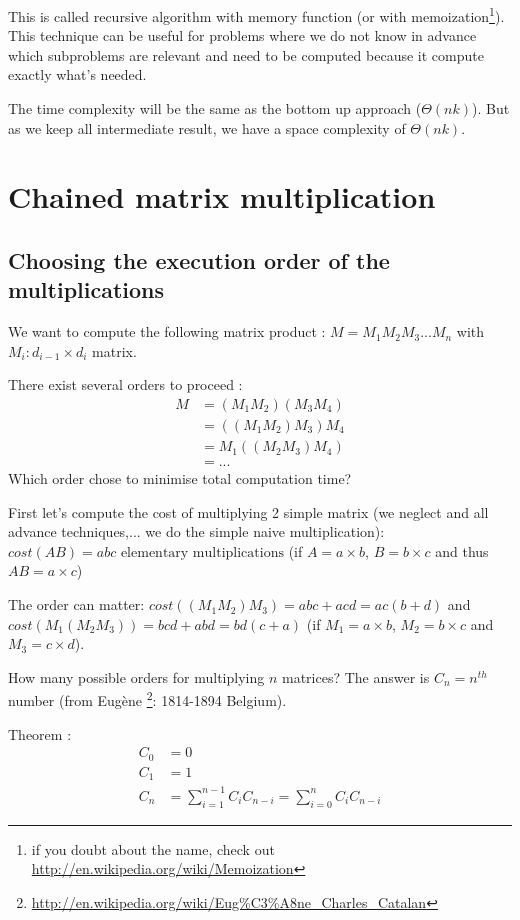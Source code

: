 This is called recursive algorithm with memory function (or with memoization\footnote{if you doubt about the name, check out \url{http://en.wikipedia.org/wiki/Memoization}}). This technique can be useful for problems where we do not know in advance which subproblems are relevant and need to be computed because it compute exactly what's needed.

The time complexity will be the same as the bottom up approach ($\Theta (nk)$). But as we keep all intermediate result, we have a space complexity of $\Theta (nk)$. 

\section{Chained matrix multiplication}

\subsection{Choosing the execution order of the multiplications}

We want to compute the following matrix product : $ M = M_1M_2M_3...M_n$ with $M_i:d_{i-1}\times d_{i}$ matrix.

There exist several orders to proceed :
\begin{align*}
M&=(M_1M_2)(M_3M_4)\\
 &= ((M_1M_2)M_3)M_4\\ 
 &= M_1((M_2M_3)M_4)\\
 &=...
\end{align*}
Which order chose to minimise total computation time?

First let's compute the cost of multiplying 2 simple matrix (we neglect  and all advance techniques,... we do the simple naive multiplication):\\
$cost(AB) = abc\text{ elementary multiplications}$ (if $A=a\times b$, $B=b\times c$ and thus $AB = a\times c$)

The order can matter: $cost((M_1M_2)M_3) = abc+acd = ac(b+d)$ and $cost(M_1(M_2M_3)) = bcd + abd=bd(c+a)$ (if $M_1=a\times b$, $M_2=b\times c$ and $M_3 = c\times d$).

How many possible orders for multiplying $n$ matrices?
The answer is $C_n = n^{th}$ number
(from Eugène \footnote{\url{http://en.wikipedia.org/wiki/Eug\%C3\%A8ne_Charles_Catalan}}: 1814-1894 Belgium).

\begin{theorem}
Theorem :
\begin{align*}
C_0 &=0\\
C_1 &=1\\
C_n &= \sum_{i=1}^{n-1} C_iC_{n-i} = \sum_{i=0}^{n}C_iC_{n-i}
\end{align*}
\end{theorem}

